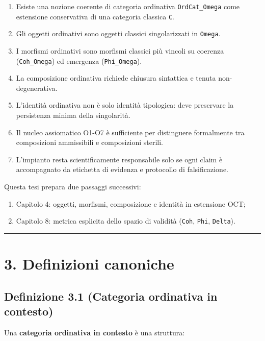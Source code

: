 \begin{enumerate}
\def\labelenumi{\arabic{enumi}.}
\tightlist
\item
  Esiste una nozione coerente di categoria ordinativa \texttt{OrdCat\_Omega} come estensione conservativa di una categoria classica \texttt{C}.
\item
  Gli oggetti ordinativi sono oggetti classici singolarizzati in \texttt{Omega}.
\item
  I morfismi ordinativi sono morfismi classici più vincoli su coerenza (\texttt{Coh\_Omega}) ed emergenza (\texttt{Phi\_Omega}).
\item
  La composizione ordinativa richiede chiusura sintattica e tenuta non-degenerativa.
\item
  L'identità ordinativa non è solo identità tipologica: deve preservare la persistenza minima della singolarità.
\item
  Il nucleo assiomatico O1-O7 è sufficiente per distinguere formalmente tra composizioni ammissibili e composizioni sterili.
\item
  L'impianto resta scientificamente responsabile solo se ogni claim è accompagnato da etichetta di evidenza e protocollo di falsificazione.
\end{enumerate}

Questa tesi prepara due passaggi successivi:

\begin{enumerate}
\def\labelenumi{\arabic{enumi}.}
\tightlist
\item
  Capitolo 4: oggetti, morfismi, composizione e identità in estensione OCT;
\item
  Capitolo 8: metrica esplicita dello spazio di validità (\texttt{Coh}, \texttt{Phi}, \texttt{Delta}).
\end{enumerate}

\begin{center}\rule{0.5\linewidth}{0.5pt}\end{center}

\section{3. Definizioni canoniche}

\subsection{Definizione 3.1 (Categoria ordinativa in contesto)}

Una \textbf{categoria ordinativa in contesto} è una struttura:

